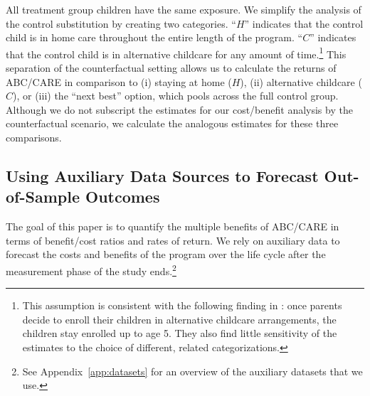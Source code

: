 All treatment group children have the same exposure. We simplify the analysis of the control substitution by creating two categories. ``$H$'' indicates that the control child is in home care throughout the entire length of the program. ``$C$'' indicates that the control child is in alternative childcare for any amount of time.\footnote{This assumption is consistent with the following finding in \cite{Garcia_Heckman_Ziff_2017_Gender-Diff_UNPUBLISHED}: once parents decide to enroll their children in alternative childcare arrangements, the children stay enrolled up to age 5. They also find little sensitivity of the estimates to the choice of different, related categorizations.}  This separation of the counterfactual setting allows us to calculate the returns of ABC/CARE in comparison to (i) staying at home ($H$), (ii) alternative childcare ($C$), or (iii) the ``next best'' option, which pools across the full control group. Although we do not subscript the estimates for our cost/benefit analysis by the counterfactual scenario, we calculate the analogous estimates for these three comparisons.

\subsection{Using Auxiliary Data Sources to Forecast Out-of-Sample Outcomes}\label{sec:usingaux}

The goal of this paper is to quantify the multiple benefits of ABC/CARE in terms of benefit/cost ratios and rates of return. We rely on auxiliary data to forecast the costs and benefits of the program over the life cycle after the measurement phase of the study ends.\footnote{See Appendix~\ref{app:datasets} for an overview of the auxiliary datasets that we use.}

